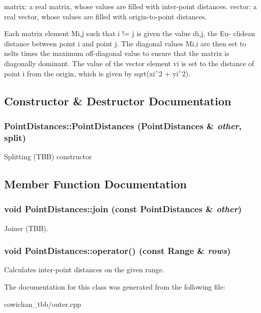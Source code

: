 matrix: a real matrix, whose values are filled with inter-point distances. vector: a real vector, whose values are filled with origin-to-point distances.

Each matrix element Mi,j such that i != j is given the value di,j, the Eu- clidean distance between point i and point j. The diagonal values Mi,i are then set to nelts times the maximum off-diagonal value to ensure that the matrix is diagonally dominant. The value of the vector element vi is set to the distance of point i from the origin, which is given by sqrt(xi$^\wedge$2 + yi$^\wedge$2). 

\subsection{Constructor \& Destructor Documentation}
\hypertarget{class_point_distances_59396cd3119746888d0601cd78757da3}{
\subsubsection[{PointDistances}]{\setlength{\rightskip}{0pt plus 5cm}PointDistances::PointDistances ({\bf PointDistances} \& {\em other}, \/  split)}}
\label{class_point_distances_59396cd3119746888d0601cd78757da3}


Splitting (TBB) constructor 

\subsection{Member Function Documentation}
\hypertarget{class_point_distances_609701c6fa66e3f0406db82bc70453d9}{
\subsubsection[{join}]{\setlength{\rightskip}{0pt plus 5cm}void PointDistances::join (const {\bf PointDistances} \& {\em other})}}
\label{class_point_distances_609701c6fa66e3f0406db82bc70453d9}


Joiner (TBB). \hypertarget{class_point_distances_ab3ec991122054f46c2d5b5f7f91e972}{
\subsubsection[{operator()}]{\setlength{\rightskip}{0pt plus 5cm}void PointDistances::operator() (const {\bf Range} \& {\em rows})}}
\label{class_point_distances_ab3ec991122054f46c2d5b5f7f91e972}


Calculates inter-point distances on the given range. 

The documentation for this class was generated from the following file:\begin{CompactItemize}
\item 
cowichan\_\-tbb/outer.cpp\end{CompactItemize}
